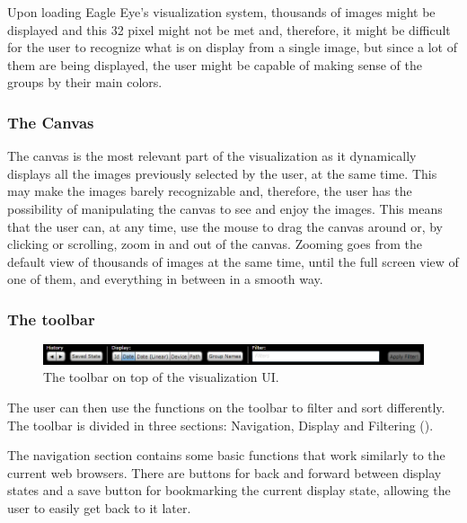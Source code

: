  Upon loading Eagle Eye's visualization system, thousands of images might be displayed and this 32 pixel might not be met and, therefore, it might be difficult for the user to recognize what is on display from a single image, but since a lot of them are being displayed, the user might be capable of making sense of the groups by their main colors.

\subsubsection{The Canvas}

The canvas is the most relevant part of the visualization as it dynamically displays all the images previously selected by the user, at the same time. This may make the images barely recognizable and, therefore, the user has the possibility of manipulating the canvas to see and enjoy the images.
This means that the user can, at any time, use the mouse to drag the canvas around or, by clicking or scrolling, zoom in and out of the canvas. Zooming goes from the default view of thousands of images at the same time, until the full screen view of one of them, and everything in between in a smooth way.

\subsubsection{The toolbar}

\begin{figure}[htbp]
	\centering
		\includegraphics[width=\linewidth]{Figures/toolbar.png}
	\caption{The toolbar on top of the visualization \ac{UI}.}
	\label{fig:toolbar}
\end{figure}


The user can then use the functions on the toolbar to filter and sort differently. The toolbar is divided in three sections: Navigation, Display and Filtering ().

The navigation section contains some basic functions that work similarly to the current web browsers. There are buttons for back and forward between display states and a save button for bookmarking the current display state, allowing the user to easily get back to it later.

